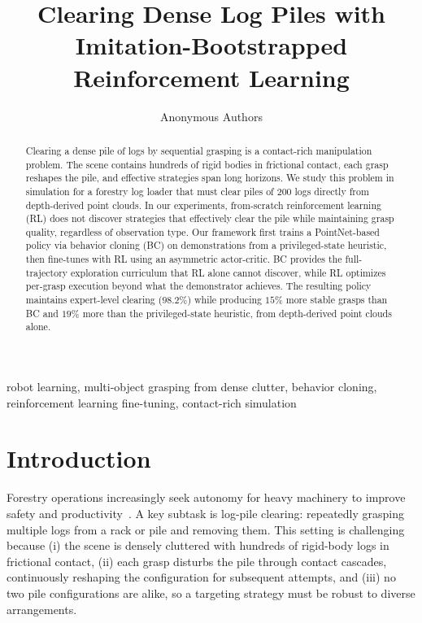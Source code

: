 \documentclass[conference]{IEEEtran}
\title{Clearing Dense Log Piles with Imitation-Bootstrapped Reinforcement Learning}
\author{
Anonymous Authors
}
\begin{document}
\maketitle

\begin{abstract}
Clearing a dense pile of logs by sequential grasping is a contact-rich manipulation problem. The scene contains hundreds of rigid bodies in frictional contact, each grasp reshapes the pile, and effective strategies span long horizons.
We study this problem in simulation for a forestry log loader that must clear piles of 200 logs directly from depth-derived point clouds.
In our experiments, from-scratch reinforcement learning (RL) does not discover strategies that effectively clear the pile while maintaining grasp quality, regardless of observation type.
Our framework first trains a PointNet-based policy via behavior cloning (BC) on demonstrations from a privileged-state heuristic, then fine-tunes with RL using an asymmetric actor-critic.
BC provides the full-trajectory exploration curriculum that RL alone cannot discover, while RL optimizes per-grasp execution beyond what the demonstrator achieves.
The resulting policy maintains expert-level clearing ($98.2$\%) while producing $15$\% more stable grasps than BC and $19$\% more than the privileged-state heuristic, from depth-derived point clouds alone.
\end{abstract}

\begin{IEEEkeywords}
robot learning, multi-object grasping from dense clutter, behavior cloning, reinforcement learning fine-tuning, contact-rich simulation
\end{IEEEkeywords}

\section{Introduction}
Forestry operations increasingly seek autonomy for heavy machinery to improve safety and productivity~\cite{lindroos2015forestry}.
A key subtask is log-pile clearing: repeatedly grasping multiple logs from a rack or pile and removing them.
This setting is challenging because (i) the scene is densely cluttered with hundreds of rigid-body logs in frictional contact, (ii) each grasp disturbs the pile through contact cascades, continuously reshaping the configuration for subsequent attempts, and (iii) no two pile configurations are alike, so a targeting strategy must be robust to diverse arrangements.
\end{document}
